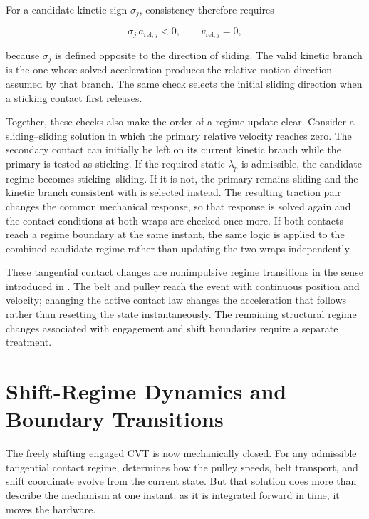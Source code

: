 \documentclass[11pt]{report}
\numberwithin{equation}{section}
\begin{document}
For a candidate kinetic sign \(\sigma_j\), consistency therefore requires

\begin{equation}
    \sigma_j\,a_{\mathrm{rel},j}<0,
    \qquad
    v_{\mathrm{rel},j}=0,
\label{eq:sliding_onset_sign_consistency}
\end{equation}

because \(\sigma_j\) is defined opposite to the direction of sliding. The
valid kinetic branch is the one whose solved acceleration produces the
relative-motion direction assumed by that branch. The same check selects the
initial sliding direction when a sticking contact first releases.

Together, these checks also make the order of a regime update clear. Consider a
sliding--sliding solution in which the primary relative velocity reaches zero.
The secondary contact can initially be left on its current kinetic branch
while the primary is tested as sticking. If the required static
\(\lambda_p\) is admissible, the candidate regime becomes
sticking--sliding. If it is not, the primary remains sliding and the kinetic
branch consistent with
 is selected instead. The resulting
traction pair changes the common mechanical response, so that response is
solved again and the contact conditions at both wraps are checked once more.
If both contacts reach a regime boundary at the same instant, the same logic
is applied to the combined candidate regime rather than updating the two wraps
independently.

These tangential contact changes are nonimpulsive regime transitions in the
sense introduced in . The belt
and pulley reach the event with continuous position and velocity; changing the
active contact law changes the acceleration that follows rather than resetting
the state instantaneously. The remaining structural regime changes associated
with engagement and shift boundaries require a separate treatment.

\section{Shift-Regime Dynamics and Boundary Transitions}
\label{sec:shift_regime_dynamics}

The freely shifting engaged CVT is now mechanically closed.
For any admissible tangential contact regime,
 determines how the pulley speeds,
belt transport, and shift coordinate evolve from the current state.
But that solution does more than describe the mechanism at one instant:
as it is integrated forward in time, it moves the hardware.
\end{document}
